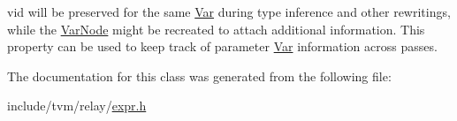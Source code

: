 vid will be preserved for the same \hyperlink{classtvm_1_1relay_1_1Var}{Var} during type inference and other rewritings, while the \hyperlink{classtvm_1_1relay_1_1VarNode}{Var\+Node} might be recreated to attach additional information. This property can be used to keep track of parameter \hyperlink{classtvm_1_1relay_1_1Var}{Var} information across passes. 

The documentation for this class was generated from the following file\+:\begin{DoxyCompactItemize}
\item 
include/tvm/relay/\hyperlink{relay_2expr_8h}{expr.\+h}\end{DoxyCompactItemize}

